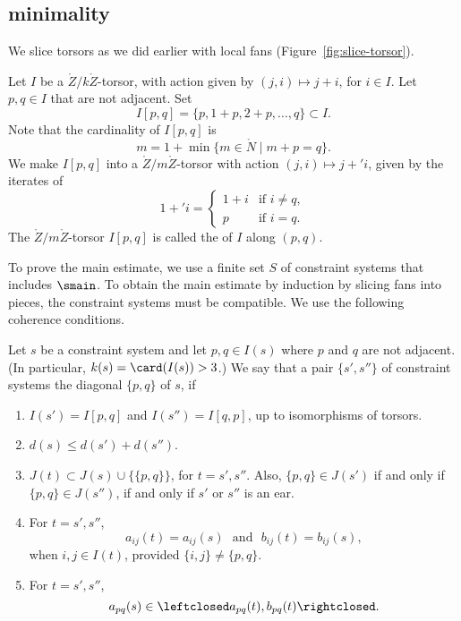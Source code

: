 \subsection{minimality}


We slice torsors as we did earlier with local fans 
(Figure~\ref{fig:slice-torsor}).



\begin{definition}[slice] 
Let $I$ be a $\ring{Z}/k\ring{Z}$-torsor, with action given by $(j,i)\mapsto j+i$,
for $i\in I$.  Let $p,q\in I$ that are not adjacent.  Set
\[
I[p,q] = \{p,1+p,2+p,\ldots,q\} \subset I.
\]
Note that the cardinality of $I[p,q]$ is
\[
m = 1 + \min \{m\in \ring{N} \mid m + p = q\}.
\]
We make $I[p,q]$ into a $\ring{Z}/m\ring{Z}$-torsor with action $(j,i)\mapsto j+' i$,
given by the iterates of
\[
1 +' i = 
\begin{cases}
  1 + i &\text{if } i\ne q,\\
  p &\text{if } i = q.
\end{cases}
\]
The $\ring{Z}/m\ring{Z}$-torsor $I[p,q]$ is called the
 of $I$ along $(p,q)$.
%
\end{definition}

\figWKUYEXM %


To prove the main estimate, we  use a finite set $S$ of constraint
systems that includes $\smain$.  To obtain the main estimate by
induction by slicing fans into pieces, the constraint systems must be
compatible. We use the following coherence conditions.

\begin{definition}
  Let $s$ be a constraint system and let $p,q\in I(s)$ where $p$ and
  $q$ are not adjacent.  (In particular, $k(s)=\card(I(s))>3$.)  We
  say that a pair $\{s',s''\}$ of constraint systems   the
  diagonal $\{p,q\}$ of $s$, if
\begin{enumerate}
\item  
 $I(s') = I[p,q]$ and $I(s'')=I[q,p]$, up to isomorphisms of torsors.
\item $d(s) \le d(s') + d(s'')$.
\item 
$J(t)\subset J(s)\cup \{\{p,q\}\}$, for  $t=s',s''$.
Also, $\{p,q\}\in J(s')$ if and only if $\{p,q\}\in J(s'')$,
 if and only if
 $s'$ or $s''$ is an ear.
\item For $t=s',s''$,
\[
a _{ij}(t) = a_{ij}(s)\text{~~and~~} b_{ij}(t) = b_{ij}(s),
\]
when $i,j\in I(t)$, provided $\{i,j\}\ne \{p,q\}$.
\item For $t=s',s''$,
\[
a_{pq}(s) \in \leftclosed a_{pq}(t),b_{pq}(t)\rightclosed.
\]
%
\end{enumerate}
\end{definition}
%

